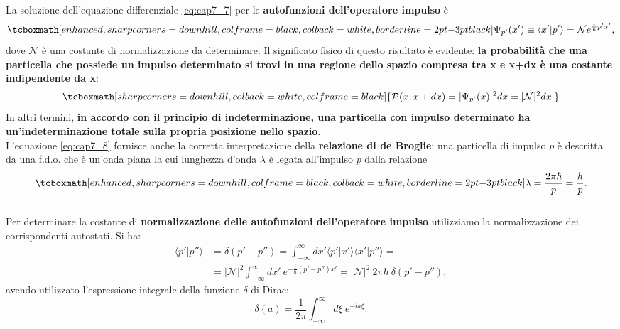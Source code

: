 La soluzione dell'equazione differenziale \eqref{eq:cap7_7} per le \textbf{autofunzioni dell'operatore impulso} è
	\begin{equation}
		\label{eq:cap7_8}
		\tcboxmath[enhanced, sharp corners=downhill, colframe=black, colback=white, borderline={2pt}{-3pt}{black}]{
			\Psi_{p'}(x') \equiv \langle x' | p' \rangle = \mathcal{N} e^{\frac{i}{\hbar}p'x'},
			}
	\end{equation}
dove $\mathcal{N}$ è una costante di normalizzazione da determinare. Il significato fisico di questo risultato è evidente: \textbf{la probabilità che una particella che possiede un impulso determinato si trovi in una regione dello spazio compresa tra x e x+dx è una costante indipendente da x}:
	\begin{equation}
		\tcboxmath[sharp corners=downhill, colback=white, colframe=black]{
			\mathcal{P}(x,x+dx) = |\Psi_{p'}(x)|^2 dx = |\mathcal{N}|^2 dx.
			}
	\end{equation}
\noindent In altri termini, \textbf{in accordo con il principio di indeterminazione, una particella con impulso determinato ha un'indeterminazione totale sulla propria posizione nello spazio}.\\

L'equazione \eqref{eq:cap7_8} fornisce anche la corretta interpretazione della \textbf{relazione di de Broglie}: una particella di impulso $p$ è descritta da una f.d.o. che è un'onda piana la cui lunghezza d'onda $\lambda$ è legata all'impulso $p$ dalla relazione
	\begin{equation}
		\tcboxmath[enhanced, sharp corners=downhill, colframe=black, colback=white, borderline={2pt}{-3pt}{black}]{
			\lambda = \frac{2 \pi \hbar}{p} = \frac{h}{p}.
			}
	\end{equation}\\
	
Per determinare la costante di \textbf{normalizzazione delle autofunzioni dell'operatore impulso} utilizziamo la normalizzazione dei corrispondenti autostati. Si ha:
	\begin{align}
		\langle p'\vert p'' \rangle &= \delta \left( p' -p''\right) =\int _{-\infty}	 ^{\infty} dx' \langle p' \vert x' \rangle \langle x' \vert p'' \rangle = \nonumber \\
		&= \vert\mathcal{N} \vert ^2 \int _{-\infty}	 ^{\infty} dx' \ e^{-\frac{i}{\hbar} \left( p'-p''\right) x'} = \vert\mathcal{N} \vert ^2\ 2 \pi \hbar\ \delta\left(p' -p'' \right),
	\end{align}
avendo utilizzato l'espressione integrale della funzione $\delta$ di Dirac:
	\begin{equation}
		\delta \left( a \right) =\frac{1}{2\pi}\int _{-\infty} ^{\infty} d\xi \ e^{-ia\xi}.
	\end{equation}\\

